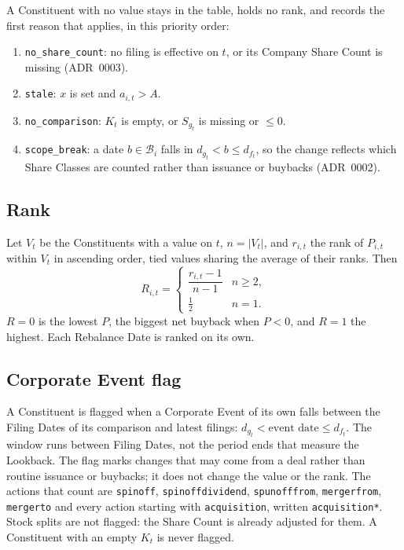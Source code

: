 \documentclass[11pt]{article}
\newcommand{\missingreason}[2]{\item \texttt{#1}: #2}
\newcommand{\eventaction}[1]{\texttt{#1}}
\begin{document}
A Constituent with no value stays in the table, holds no rank, and records the first reason
that applies, in this priority order:

\begin{enumerate}
  \missingreason{no\_share\_count}{no filing is effective on $t$, or its Company Share Count is missing (ADR~0003).}
  \missingreason{stale}{$x$ is set and $a_{i,t} > A$.}
  \missingreason{no\_comparison}{$K_t$ is empty, or $S_{g_t}$ is missing or $\le 0$.}
  \missingreason{scope\_break}{a date $b \in \mathcal{B}_i$ falls in $d_{g_t} < b \le d_{f_t}$, so the change reflects which Share Classes are counted rather than issuance or buybacks (ADR~0002).}
\end{enumerate}

\subsection{Rank}

Let $V_t$ be the Constituents with a value on $t$, $n = |V_t|$, and $r_{i,t}$ the rank of
$P_{i,t}$ within $V_t$ in ascending order, tied values sharing the average of their ranks.
Then
\begin{equation}
  R_{i,t} =
  \begin{cases}
    \dfrac{r_{i,t} - 1}{n - 1} & n \ge 2, \\[1ex]
    \tfrac{1}{2} & n = 1 .
  \end{cases}
\end{equation}
$R = 0$ is the lowest $P$, the biggest net buyback when $P < 0$, and $R = 1$ the highest. Each Rebalance Date is
ranked on its own.

\subsection{Corporate Event flag}

A Constituent is flagged when a Corporate Event of its own falls between the Filing Dates of
its comparison and latest filings: $d_{g_t} < \text{event date} \le d_{f_t}$. The window runs
between Filing Dates, not the period ends that measure the Lookback. The flag marks changes that may
come from a deal rather than routine issuance or buybacks; it does not change the value or the
rank. The actions that count are
\eventaction{spinoff}, \eventaction{spinoffdividend}, \eventaction{spunofffrom},
\eventaction{mergerfrom}, \eventaction{mergerto} and every action starting with
\texttt{acquisition}, written \eventaction{acquisition*}. Stock splits are not flagged: the
Share Count is already adjusted for them. A Constituent with an empty $K_t$
is never flagged.
\end{document}
